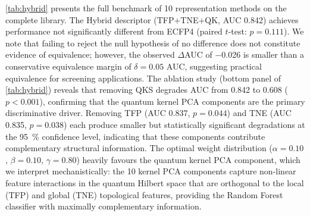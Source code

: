 \documentclass[11pt,a4paper]{article}
\begin{document}
\cref{tab:hybrid} presents the full benchmark of 10 representation methods on the complete library. The Hybrid descriptor (TFP+TNE+QK, AUC \num{0.842}) achieves performance not significantly different from ECFP4 (paired $t$-test: $p = \num{0.111}$). We note that failing to reject the null hypothesis of no difference does not constitute evidence of equivalence; however, the observed $\Delta$AUC of \num{-0.026} is smaller than a conservative equivalence margin of $\delta = 0.05$ AUC, suggesting practical equivalence for screening applications. The ablation study (bottom panel of \cref{tab:hybrid}) reveals that removing QKS degrades AUC from \num{0.842} to \num{0.608} ($p < \num{0.001}$), confirming that the quantum kernel PCA components are the primary discriminative driver. Removing TFP (AUC \num{0.837}, $p = \num{0.044}$) and TNE (AUC \num{0.835}, $p = \num{0.038}$) each produce smaller but statistically significant degradations at the \qty{95}{\percent} confidence level, indicating that these components contribute complementary structural information. The optimal weight distribution ($\alpha = 0.10$, $\beta = 0.10$, $\gamma = 0.80$) heavily favours the quantum kernel PCA component, which we interpret mechanistically: the 10 kernel PCA components capture non-linear feature interactions in the quantum Hilbert space that are orthogonal to the local (TFP) and global (TNE) topological features, providing the Random Forest classifier with maximally complementary information.
\end{document}
